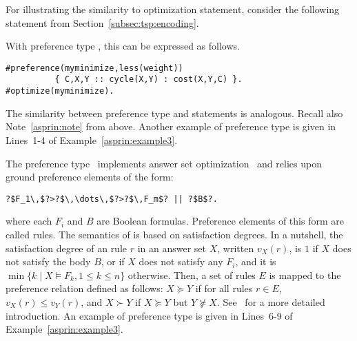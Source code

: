 For illustrating the similarity to optimization statement,
consider the following  statement from Section~\ref{subsec:tsp:encoding}.
%

%
With preference type ,
this can be expressed as follows.
\begin{lstlisting}[numbers=none]
#preference(myminimize,less(weight))
          { C,X,Y :: cycle(X,Y) : cost(X,Y,C) }.
#optimize(myminimize).
\end{lstlisting}
The similarity between  preference type  and  statements is analogous.
Recall also Note~\ref{asprin:note} from above.
%
Another example of preference type  is given in Lines~1-4 of Example~\ref{asprin:example3}.

The preference type~ implements answer set optimization~\cite{brnitr03a} and relies upon
ground preference elements of the form:
\begin{lstlisting}[numbers=none,escapechar=?]
?$F_1\,$?>?$\,\dots\,$?>?$\,F_m$? || ?$B$?.
\end{lstlisting}
where each $F_i$ and $B$ are Boolean formulas.
Preference elements of this form are called  rules.  
The semantics of  is based on satisfaction degrees.
In a nutshell,
the satisfaction degree of an  rule $r$ in an answer set $X$, 
written $v_X(r)$, is 
$1$ if $X$ does not satisfy the body $B$, %
or  if $X$ does not satisfy any $F_i$, 
and it is $\min\{k \mid X \models F_k, 1\leq k\leq n\}$ otherwise.
Then, a set of  rules $E$ is mapped to the preference relation defined as follows:
$X \succeq Y$ if for all rules $r \in E$, $v_X(r) \leq v_Y(r)$, 
and $X \succ Y$ if $X \succeq Y$ but $Y \not\succeq X$. 
See~\cite{brnitr03a} for a more detailed introduction.
%
An example of preference type  is given in Lines~6-9 of Example~\ref{asprin:example3}.

